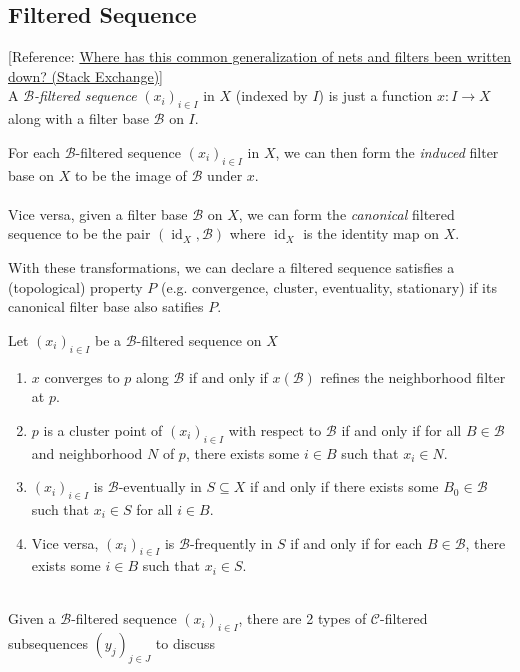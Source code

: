 \documentclass{treatise}
\begin{document}
\subsection{Filtered Sequence}
[Reference: \href{https://math.stackexchange.com/questions/1568548/where-has-this-common-generalization-of-nets-and-filters-been-written-down}{Where has this common generalization of nets and filters been written down? (Stack Exchange)}]
\\
A \emph{$\mathcal{B}$-filtered sequence} $(x_i)_{i \in I}$ in $X$ (indexed by $I$) is just a function $x: I \to X$ along with a filter base $\mathcal{B}$ on $I$.
\begin{remark}
For each $\mathcal{B}$-filtered sequence $(x_i)_{i \in I}$ in $X$, we can then form the \emph{induced} filter base on $X$ to be the image of $\mathcal{B}$ under $x$.
\\
\\
Vice versa, given a filter base $\mathcal{B}$ on $X$, we can form the \emph{canonical} filtered sequence to be the pair $(\operatorname{id}_X, \mathcal{B})$ where $\operatorname{id}_X$ is the identity map on $X$.
\end{remark}
With these transformations, we can declare a filtered sequence satisfies a (topological) property $P$ (e.g. convergence, cluster, eventuality, stationary) if its canonical filter base also satifies $P$.
\begin{remark}
Let $(x_i)_{i \in I}$ be a $\mathcal{B}$-filtered sequence on $X$
\begin{enumerate}
    \item $x$ converges to $p$ along $\mathcal{B}$ if and only if $x(\mathcal{B})$ refines the neighborhood filter at $p$.
    \item $p$ is a cluster point of $(x_i)_{i \in I}$ with respect to $\mathcal{B}$ if and only if for all $B \in \mathcal{B}$ and neighborhood $N$ of $p$, there exists some $i \in B$ such that $x_i \in N$.
    \item $(x_i)_{i \in I}$ is $\mathcal{B}$-eventually in $S \subseteq X$ if and only if there exists some $B_0 \in \mathcal{B}$ such that $x_i \in S$ for all $i \in B$.
    \item Vice versa, $(x_i)_{i \in I}$ is $\mathcal{B}$-frequently in $S$ if and only if for each $B \in \mathcal{B}$, there exists some $i \in B$ such that $x_i \in S$.
\end{enumerate}
\end{remark}
\ 
\\
Given a $\mathcal{B}$-filtered sequence $(x_i)_{i \in I}$, there are 2 types of $\mathcal{C}$-filtered subsequences $(y_j)_{j \in J}$ to discuss
\end{document}
